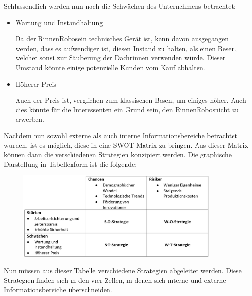         \noindent Schlussendlich werden nun noch die Schwächen des Unternehmens betrachtet:
        
            \begin{itemize}
                \item Wartung und Instandhaltung
        
                    Da der \as RinnenRobos\adl ein technisches Gerät ist, kann davon ausgegangen werden, dass es
                    aufwendiger ist, diesen Instand zu halten, als einen Besen, welcher sonst zur Säuberung der 
                    Dachrinnen verwenden würde. Dieser Umstand könnte einige potenzielle Kunden vom Kauf abhalten.
                \item Höherer Preis
                
                    Auch der Preis ist, verglichen zum klassischen Besen, um einiges höher. Auch dies könnte für die
                    Interessenten ein Grund sein, den \as RinnenRobos\adl nicht zu erwerben.
            \end{itemize}
        
        \noindent Nachdem nun sowohl externe als auch interne Informationsbereiche betrachtet wurden, ist es möglich, diese in
        eine SWOT-Matrix zu bringen. Aus dieser Matrix können dann die verschiedenen Strategien konzipiert werden. Die graphische
        Darstellung in Tabellenform ist die folgende:
        
            \begin{figure}[ht]
                \centering
                \includegraphics[width = 0.9\textwidth]{Eigene Darstellungen/SWOT Tabelle.jpg}
            \end{figure}
        
        \noindent Nun müssen aus dieser Tabelle verschiedene Strategien abgeleitet werden. Diese Strategien finden sich in den
        vier Zellen, in denen sich interne und externe Informationsbereiche überschneiden.
        
